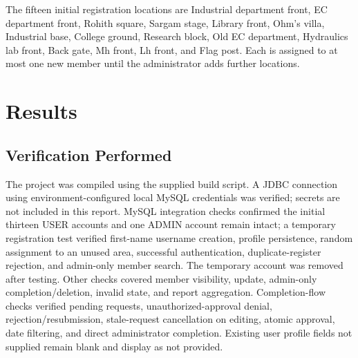 \documentclass[12pt,a4paper]{report}
\begin{document}
The fifteen initial registration locations are Industrial department front, EC department front, Rohith square, Sargam stage, Library front, Ohm's villa, Industrial base, College ground, Research block, Old EC department, Hydraulics lab front, Back gate, Mh front, Lh front, and Flag post. Each is assigned to at most one new member until the administrator adds further locations.

\chapter{Results}
\section{Verification Performed}
The project was compiled using the supplied build script. A JDBC connection using environment-configured local MySQL credentials was verified; secrets are not included in this report. MySQL integration checks confirmed the initial thirteen USER accounts and one ADMIN account remain intact; a temporary registration test verified first-name username creation, profile persistence, random assignment to an unused area, successful authentication, duplicate-register rejection, and admin-only member search. The temporary account was removed after testing. Other checks covered member visibility, update, admin-only completion/deletion, invalid state, and report aggregation. Completion-flow checks verified pending requests, unauthorized-approval denial, rejection/resubmission, stale-request cancellation on editing, atomic approval, date filtering, and direct administrator completion. Existing user profile fields not supplied remain blank and display as not provided.
\end{document}
